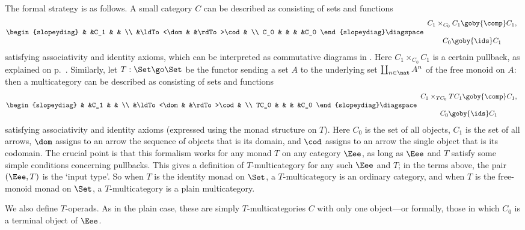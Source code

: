 The formal strategy is as follows.  A small category $C$
can be described as consisting of sets and functions%
%
%
\[
\begin{slopeydiag}
	&	&C_1	&	&	\\
	&\ldTo<\dom&	&\rdTo>\cod&	\\
C_0	&	&	&	&C_0
\end{slopeydiag}
\diagspace
\begin{array}{c}
C_1 \times_{C_0} C_1 \goby{\comp} C_1,	\\
\\
C_0 \goby{\ids} C_1
\end{array}
\]
satisfying associativity and identity axioms, which can be interpreted as
commutative diagrams in \Set.  Here $C_1 \times_{C_0} C_1$ is a certain
pullback, as explained on p.~\pageref{p:defn-caty-pb}.  Similarly, let $T:
\Set \go \Set$ be the functor sending a set $A$ to the underlying set
$\coprod_{n\in\nat} A^n$ of the free monoid on $A$: then a multicategory
can be described as consisting of sets and functions
\[
\begin{slopeydiag}
	& &C_1 & & \\ &\ldTo<\dom& &\rdTo>\cod& \\ TC_0 & & & &C_0
\end{slopeydiag}
\diagspace
\begin{array}{c}
C_1 \times_{TC_0} TC_1 \goby{\comp} C_1,\\
\\
C_0 \goby{\ids} C_1
\end{array}
\]
satisfying associativity and identity axioms (expressed using the monad
structure on $T$).  Here $C_0$ is the set of all objects, $C_1$ is the set
of all arrows, $\dom$ assigns to an arrow the sequence of objects that is
its domain, and $\cod$ assigns to an arrow the single object that is its
codomain.  The crucial point is that this formalism works for any monad $T$
on any category $\Eee$, as long as $\Eee$ and $T$ satisfy some simple
conditions concerning pullbacks.  This gives a definition of
$T$-multicategory for any such $\Eee$ and $T$; in the terms above, the
pair $(\Eee,T)$ is the `input type'.  So when $T$ is the identity monad on
$\Set$, a $T$-multicategory is an ordinary category, and when $T$ is the
free-monoid monad on $\Set$, a $T$-multicategory is a plain multicategory.

We also define $T$-operads.  As in the plain case, these are simply
 $T$-multicategories $C$ with only one object---or formally, those in which
 $C_0$ is a terminal object of $\Eee$.

